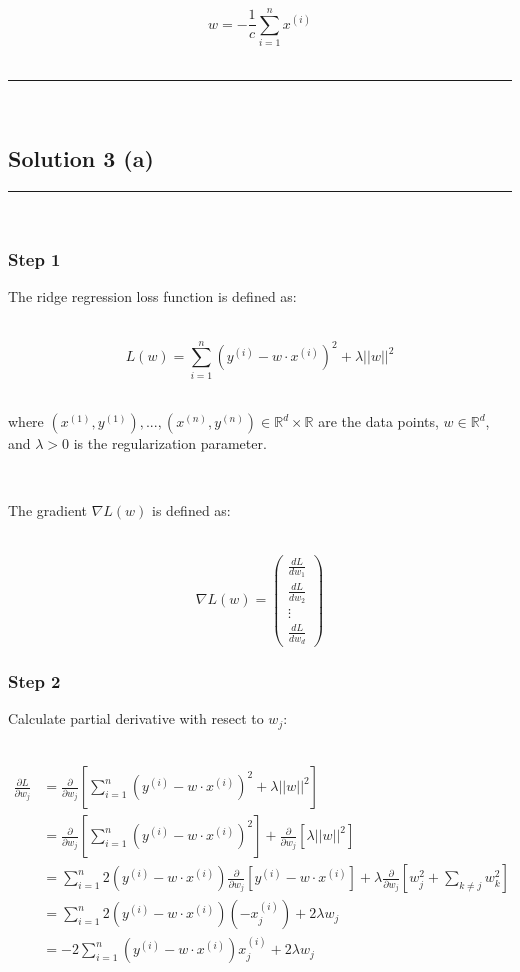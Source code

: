 \documentclass{article}
\begin{document}
$$w = -\frac{1}{c}\sum_{i=1}^{n} x^{(i)}$$\\

\noindent\rule{\textwidth}{0.4pt}\\

\newpage

\subsection*{Solution 3 (a)}
\noindent\rule{\textwidth}{0.4pt}\\

\subsubsection*{Step 1}
\parbox{\textwidth}{
The ridge regression loss function is defined as:
}\\

$$L(w)=\sum_{i=1}^{n}(y^{(i)}-w\cdot x^{(i)})^{2}+\lambda||w||^{2}$$\\

\parbox{\textwidth}{
where $(x^{(1)},y^{(1)}),...,(x^{(n)},y^{(n)})\in\mathbb{R}^{d}\times\mathbb{R}$ are the data points, $w\in\mathbb{R}^{d}$, and $\lambda > 0$ is the regularization parameter.
}\\

\parbox{\textwidth}{
The gradient $\nabla L(w)$ is defined as:
}\\

$$\nabla L(w) = \begin{pmatrix} 
\frac{dL}{dw_1} \\
\frac{dL}{dw_2} \\
\vdots \\
\frac{dL}{dw_d}
\end{pmatrix}$$

\subsubsection*{Step 2}
\parbox{\textwidth}{
Calculate partial derivative with resect to $w_j$:
}\\

\begin{align*}
\frac{\partial L}{\partial w_j} &= \frac{\partial}{\partial w_j}\left[\sum_{i=1}^{n}(y^{(i)}-w\cdot x^{(i)})^{2}+\lambda||w||^{2}\right] \\
&= \frac{\partial}{\partial w_j}\left[\sum_{i=1}^{n}(y^{(i)}-w\cdot x^{(i)})^{2}\right] + \frac{\partial}{\partial w_j}\left[\lambda||w||^{2}\right] \\
&= \sum_{i=1}^{n}2(y^{(i)}-w\cdot x^{(i)})\frac{\partial}{\partial w_j}\left[y^{(i)}-w\cdot x^{(i)}\right] + \lambda\frac{\partial}{\partial w_j}\left[w_j^2 + \sum_{k \neq j} w_k^2\right] \\
&= \sum_{i=1}^{n}2(y^{(i)}-w\cdot x^{(i)})(-x_j^{(i)}) + 2\lambda w_j \\
&= -2\sum_{i=1}^{n}(y^{(i)}-w\cdot x^{(i)})x_j^{(i)} + 2\lambda w_j
\end{align*}
\end{document}
